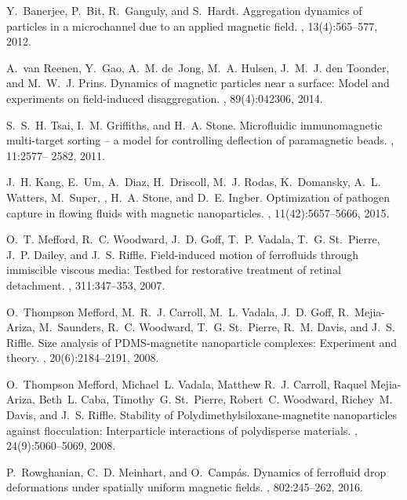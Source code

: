 \begin{thebibliography}{10}
Y.~Banerjee, P.~Bit, R.~Ganguly, and S.~Hardt.
\newblock Aggregation dynamics of particles in a microchannel due to an applied
  magnetic field.
, 13(4):565--577, 2012.

A.~van Reenen, Y.~Gao, A.~M. de~Jong, M.~A. Hulsen, J.~M.~J. den Toonder, and
  M.~W.~J. Prins.
\newblock Dynamics of magnetic particles near a surface: Model and experiments
  on field-induced disaggregation.
, 89(4):042306, 2014.

S.~S.~H. Tsai, I.~M. Griffiths, and H.~A. Stone.
\newblock Microfluidic immunomagnetic multi-target sorting -- a model for
  controlling deflection of paramagnetic beads.
, 11:2577-- 2582, 2011.

J.~H. Kang, E.~Um, A.~Diaz, H.~Driscoll, M.~J. Rodas, K.~Domansky, A.~L.
  Watters, M.~Super, , H.~A. Stone, and D.~E. Ingber.
\newblock Optimization of pathogen capture in flowing fluids with magnetic
  nanoparticles.
, 11(42):5657--5666, 2015.

O.~T. Mefford, R.~C. Woodward, J.~D. Goff, T.~P. Vadala, T.~G. {St.~Pierre},
  J.~P. Dailey, and J.~S. Riffle.
\newblock Field-induced motion of ferrofluids through immiscible viscous media:
  {T}estbed for restorative treatment of retinal detachment.
, 311:347--353, 2007.

O.~Thompson Mefford, M.~R.~J. Carroll, M.~L. Vadala, J.~D. Goff,
  R.~Mejia-Ariza, M.~Saunders, R.~C. Woodward, T.~G. {St.~Pierre}, R.~M. Davis,
  and J.~S. Riffle.
\newblock Size analysis of {P}{D}{M}{S}-magnetite nanoparticle complexes:
  Experiment and theory.
, 20(6):2184--2191, 2008.

O.~Thompson Mefford, Michael~L. Vadala, Matthew R.~J. Carroll, Raquel
  Mejia-Ariza, Beth~L. Caba, Timothy~G. {St.~Pierre}, Robert~C. Woodward,
  Richey~M. Davis, and J.~S. Riffle.
\newblock Stability of {P}olydimethylsiloxane-magnetite nanoparticles against
  flocculation: Interparticle interactions of polydisperse materials.
, 24(9):5060--5069, 2008.

P.~Rowghanian, C.~D. Meinhart, and O.~Camp\'as.
\newblock Dynamics of ferrofluid drop deformations under spatially uniform
  magnetic fields.
, 802:245--262, 2016.


\end{thebibliography}
